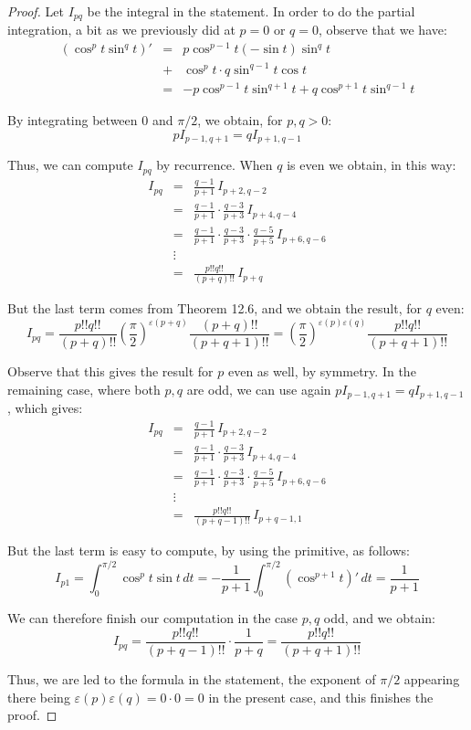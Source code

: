 \documentclass[12pt]{amsbook}
\begin{document}
\begin{proof}
Let $I_{pq}$ be the integral in the statement. In order to do the partial integration, a bit as we previously did at $p=0$ or $q=0$, observe that we have:
\begin{eqnarray*}
(\cos^pt\sin^qt)'
&=&p\cos^{p-1}t(-\sin t)\sin^qt\\
&+&\cos^pt\cdot q\sin^{q-1}t\cos t\\
&=&-p\cos^{p-1}t\sin^{q+1}t+q\cos^{p+1}t\sin^{q-1}t
\end{eqnarray*}

By integrating between $0$ and $\pi/2$, we obtain, for $p,q>0$:
$$pI_{p-1,q+1}=qI_{p+1,q-1}$$

Thus, we can compute $I_{pq}$ by recurrence. When $q$ is even we obtain, in this way:
\begin{eqnarray*}
I_{pq}
&=&\frac{q-1}{p+1}\,I_{p+2,q-2}\\
&=&\frac{q-1}{p+1}\cdot\frac{q-3}{p+3}\,I_{p+4,q-4}\\
&=&\frac{q-1}{p+1}\cdot\frac{q-3}{p+3}\cdot\frac{q-5}{p+5}\,I_{p+6,q-6}\\
&\vdots&\\
&=&\frac{p!!q!!}{(p+q)!!}\,I_{p+q}
\end{eqnarray*}

But the last term comes from Theorem 12.6, and we obtain the result, for $q$ even:
$$I_{pq}
=\frac{p!!q!!}{(p+q)!!}\left(\frac{\pi}{2}\right)^{\varepsilon(p+q)}\frac{(p+q)!!}{(p+q+1)!!}
=\left(\frac{\pi}{2}\right)^{\varepsilon(p)\varepsilon(q)}\frac{p!!q!!}{(p+q+1)!!}$$

Observe that this gives the result for $p$ even as well, by symmetry. In the remaining case, where both $p,q$ are odd, we can use again $pI_{p-1,q+1}=qI_{p+1,q-1}$, which gives:
\begin{eqnarray*}
I_{pq}
&=&\frac{q-1}{p+1}\,I_{p+2,q-2}\\
&=&\frac{q-1}{p+1}\cdot\frac{q-3}{p+3}\,I_{p+4,q-4}\\
&=&\frac{q-1}{p+1}\cdot\frac{q-3}{p+3}\cdot\frac{q-5}{p+5}\,I_{p+6,q-6}\\
&\vdots&\\
&=&\frac{p!!q!!}{(p+q-1)!!}\,I_{p+q-1,1}
\end{eqnarray*}

But the last term is easy to compute, by using the primitive, as follows:
$$I_{p1}
=\int_0^{\pi/2}\cos^pt\sin t\,dt
=-\frac{1}{p+1}\int_0^{\pi/2}(\cos^{p+1}t)'\,dt
=\frac{1}{p+1}$$

We can therefore finish our computation in the case $p,q$ odd, and we obtain:
$$I_{pq}
=\frac{p!!q!!}{(p+q-1)!!}\cdot\frac{1}{p+q}
=\frac{p!!q!!}{(p+q+1)!!}$$

Thus, we are led to the formula in the statement, the exponent of $\pi/2$ appearing there being $\varepsilon(p)\varepsilon(q)=0\cdot 0=0$ in the present case, and this finishes the proof.
\end{proof}
\end{document}

